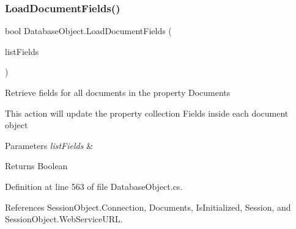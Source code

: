\subsubsection{\texorpdfstring{Load\+Document\+Fields()}{LoadDocumentFields()}\hspace{0.1cm}{\footnotesize\ttfamily [2/2]}}
{\footnotesize\ttfamily bool Database\+Object.\+Load\+Document\+Fields (\begin{DoxyParamCaption}\item[{I\+List}]{list\+Fields }\end{DoxyParamCaption})}



Retrieve fields for all documents in the property \textquotesingle{}Documents\textquotesingle{} 

This action will update the property collection Fields inside each document object


\begin{DoxyParams}{Parameters}
{\em list\+Fields} & \\
\hline
\end{DoxyParams}
\begin{DoxyReturn}{Returns}
Boolean
\end{DoxyReturn}


Definition at line 563 of file Database\+Object.\+cs.



References Session\+Object.\+Connection, Documents, Is\+Initialized, Session, and Session\+Object.\+Web\+Service\+U\+RL.



